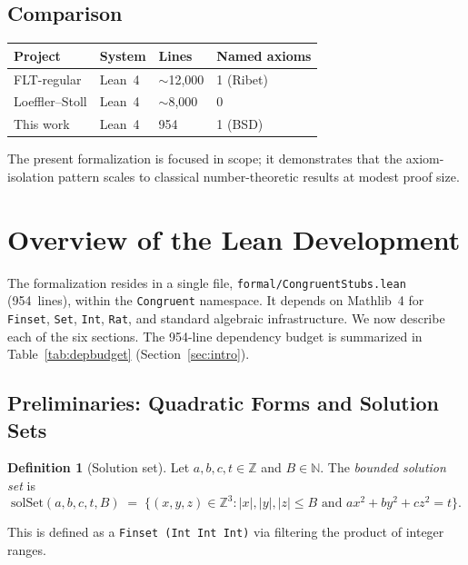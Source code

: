 \documentclass[11pt,a4paper]{article}
\theoremstyle{definition}
\newtheorem{definition}[theorem]{Definition}
\newcommand{\Z}{\mathbb{Z}}
\newcommand{\N}{\mathbb{N}}
\newcommand{\lean}[1]{\texttt{#1}}
\newcommand{\solSet}{\mathrm{solSet}}
\begin{document}
\subsection*{Comparison}
\begin{center}
\begin{tabular}{llll}
\hline
Project & System & Lines & Named axioms \\
\hline
FLT-regular \cite{FLTregular2025}
  & Lean~4 & $\sim$12{,}000 & 1 (Ribet) \\
Loeffler--Stoll \cite{LoefflerStoll2025}
  & Lean~4 & $\sim$8{,}000 & 0 \\
This work & Lean~4 & 954 & 1 (BSD) \\
\hline
\end{tabular}
\end{center}

The present formalization is focused in scope; it demonstrates
that the axiom-isolation pattern scales to classical
number-theoretic results at modest proof size.

\section{Overview of the Lean Development}\label{sec:lean}

The formalization resides in a single file,
\texttt{formal/CongruentStubs.lean} (954~lines), within the
\lean{Congruent} namespace.  It depends on Mathlib~4 for
\lean{Finset}, \lean{Set}, \lean{Int}, \lean{Rat}, and standard
algebraic infrastructure.  We now describe each of the six sections.
The 954-line dependency budget is summarized in
Table~\ref{tab:depbudget} (Section~\ref{sec:intro}).

\subsection{Preliminaries: Quadratic Forms and Solution Sets}\label{sec:s1}

\begin{definition}[Solution set]\label{def:solset}
Let $a, b, c, t \in \Z$ and $B \in \N$.  The \emph{bounded solution
set} is
\[
  \solSet(a,b,c,t,B) \;=\;
  \bigl\{(x,y,z) \in \Z^3 : |x|,|y|,|z| \le B
    \text{ and } ax^2 + by^2 + cz^2 = t\bigr\}.
\]
\end{definition}

This is defined as a \lean{Finset (Int \texttimes{} Int \texttimes{} Int)}
via filtering the product of integer ranges.
\end{document}
